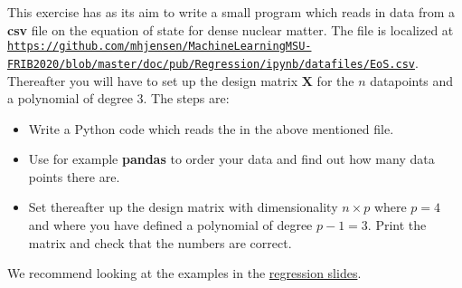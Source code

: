 \documentclass[%
oneside,                 %
final,                   %
10pt]{article}
\newenvironment{doconceexercise}{}{}
\newcounter{doconceexercisecounter}
\begin{document}
\begin{doconceexercise}

                             

This exercise has as its aim to write a small program which reads in data from a \textbf{csv} file on the equation of state for dense nuclear matter. The file is localized at \href{{https://github.com/mhjensen/MachineLearningMSU-FRIB2020/blob/master/doc/pub/Regression/ipynb/datafiles/EoS.csv}}{\nolinkurl{https://github.com/mhjensen/MachineLearningMSU-FRIB2020/blob/master/doc/pub/Regression/ipynb/datafiles/EoS.csv}}. Thereafter you will have to set up the design matrix $\bm{X}$ for the  $n$
datapoints and a polynomial of degree $3$. The steps are:
\begin{itemize}
\item Write a Python code which reads the in the above mentioned file.

\item Use for example \textbf{pandas} to order your data and find out how many data points there are.

\item Set thereafter up the design matrix with dimensionality $n\times p$ where $p=4$ and where you have defined a polynomial of degree $p-1=3$. Print the matrix and check that the numbers are correct. 
\end{itemize}

\noindent
We recommend looking at the examples in the \href{{https://compphysics.github.io/MachineLearning/doc/pub/Regression/html/Regression-bs.html}}{regression slides}.


\end{doconceexercise}
\end{document}
